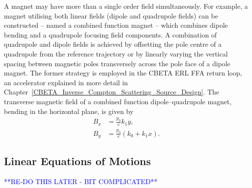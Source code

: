 \documentclass[../main.tex]{subfiles}
\begin{document}
A magnet may have more than a single order field simultaneously. For example, a magnet utilising both linear fields (dipole and quadrupole fields) can be constructed -- named a combined function magnet -- which combines dipole bending and a quadrupole focusing field components. A combination of quadrupole and dipole fields is achieved by offsetting the pole centre of a quadrupole from the reference trajectory or by linearly varying the vertical spacing between magnetic poles transversely across the pole face of a dipole magnet. The former strategy is employed in the CBETA ERL FFA return loop, an accelerator explained in more detail in Chapter~\ref{CBETA_Inverse_Compton_Scattering_Source_Design}. The transverse magnetic field of a combined function dipole--quadrupole magnet, bending in the horizontal plane, is given by 
\begin{align}
B_{x} &= \frac{p_{0}}{e}k_{1}y, \nonumber\\
B_{y} &= \frac{p_{0}}{e}\left(k_{0}+k_{1}x\right).
\label{eq:combined_function_field}    
\end{align}

\subsection{Linear Equations of Motions}
\label{sec:equations_of_motion}

\textcolor{blue}{**RE-DO THIS LATER - BIT COMPLICATED**}
\end{document}
